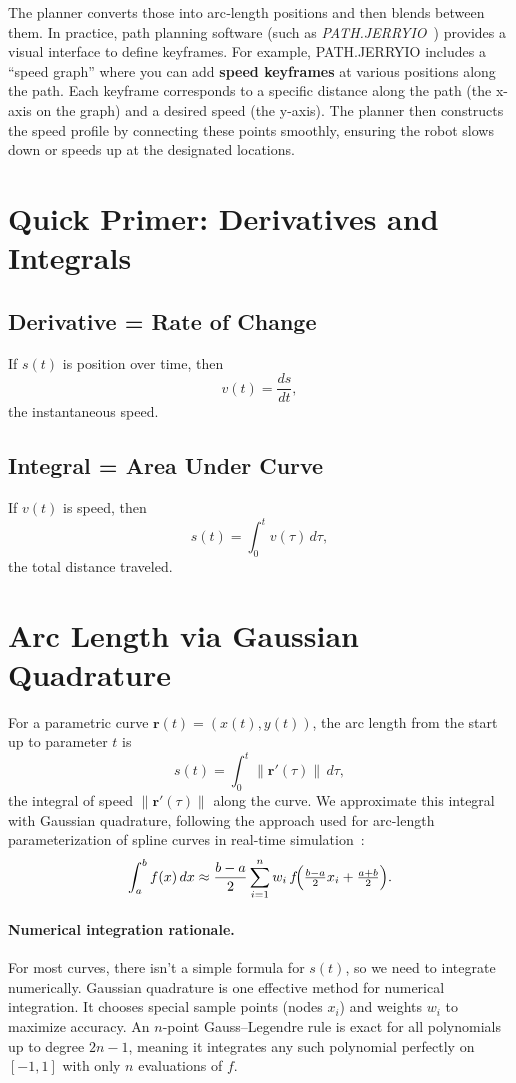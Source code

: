 \documentclass[11pt]{article}
\begin{document}
The planner converts those into arc‐length positions and then blends between them. In practice, path planning software (such as \textit{PATH.JERRYIO}~\cite{jerryio}) provides a visual interface to define keyframes. For example, PATH.JERRYIO includes a ``speed graph'' where you can add \textbf{speed keyframes} at various positions along the path. Each keyframe corresponds to a specific distance along the path (the x-axis on the graph) and a desired speed (the y-axis). The planner then constructs the speed profile by connecting these points smoothly, ensuring the robot slows down or speeds up at the designated locations.

\section{Quick Primer: Derivatives and Integrals}

\subsection*{Derivative = Rate of Change}

If \(s(t)\) is position over time, then
\[
v(t) = \frac{ds}{dt},
\]
the instantaneous speed.

\subsection*{Integral = Area Under Curve}

If \(v(t)\) is speed, then
\[
s(t) = \int_{0}^{t} v(\tau)\,d\tau,
\]
the total distance traveled.

\section{Arc Length via Gaussian Quadrature}

For a parametric curve \(\mathbf r(t) = (x(t), y(t))\), the arc length from the start up to parameter \(t\) is 
\[
s(t) = \int_{0}^{t} \|\mathbf r'(\tau)\|\,d\tau,
\] 
the integral of speed \(\|\mathbf r'(\tau)\|\) along the curve. We approximate this integral with Gaussian quadrature, following the approach used for arc-length parameterization of spline curves in real-time simulation~\cite{wang}:
\[
\int_a^b f(x)\,dx \approx \frac{b-a}{2}\sum_{i=1}^n w_i\,f\!\Bigl(\tfrac{b-a}{2}x_i + \tfrac{a+b}{2}\Bigr).
\]

\paragraph{Numerical integration rationale.}%
For most curves, there isn't a simple formula for \(s(t)\), so we need to integrate numerically. Gaussian quadrature is one effective method for numerical integration. It chooses special sample points (nodes \(x_i\)) and weights \(w_i\) to maximize accuracy. An \(n\)-point Gauss–Legendre rule is exact for all polynomials up to degree \(2n-1\), meaning it integrates any such polynomial perfectly on \([-1,1]\) with only \(n\) evaluations of \(f\).
\end{document}

